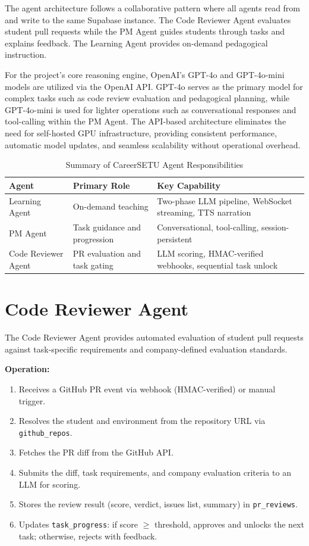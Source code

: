 \documentclass[12pt,a4paper]{report}
\begin{document}
The agent architecture follows a collaborative pattern where all agents read from and write to the same Supabase instance. The Code Reviewer Agent evaluates student pull requests while the PM Agent guides students through tasks and explains feedback. The Learning Agent provides on-demand pedagogical instruction.

For the project's core reasoning engine, OpenAI's GPT-4o and GPT-4o-mini models are utilized via the OpenAI API. GPT-4o serves as the primary model for complex tasks such as code review evaluation and pedagogical planning, while GPT-4o-mini is used for lighter operations such as conversational responses and tool-calling within the PM Agent. The API-based architecture eliminates the need for self-hosted GPU infrastructure, providing consistent performance, automatic model updates, and seamless scalability without operational overhead.

\begin{table}[H]
\caption{Summary of CareerSETU Agent Responsibilities}
\label{tab:agents}
\centering
\begin{tabular}{p{2.5cm}p{3.5cm}p{6cm}}
\toprule
\textbf{Agent} & \textbf{Primary Role} & \textbf{Key Capability} \\
\midrule
Learning Agent & On-demand teaching & Two-phase LLM pipeline, WebSocket streaming, TTS narration \\
PM Agent & Task guidance and progression & Conversational, tool-calling, session-persistent \\
Code Reviewer Agent & PR evaluation and task gating & LLM scoring, HMAC-verified webhooks, sequential task unlock \\
\bottomrule
\end{tabular}
\end{table}

\section{Code Reviewer Agent}

The Code Reviewer Agent provides automated evaluation of student pull requests against task-specific requirements and company-defined evaluation standards.

\noindent\textbf{Operation:}
\begin{enumerate}
    \item Receives a GitHub PR event via webhook (HMAC-verified) or manual trigger.
    \item Resolves the student and environment from the repository URL via \texttt{github\_repos}.
    \item Fetches the PR diff from the GitHub API.
    \item Submits the diff, task requirements, and company evaluation criteria to an LLM for scoring.
    \item Stores the review result (score, verdict, issues list, summary) in \texttt{pr\_reviews}.
    \item Updates \texttt{task\_progress}: if score $\geq$ threshold, approves and unlocks the next task; otherwise, rejects with feedback.
\end{enumerate}
\end{document}
